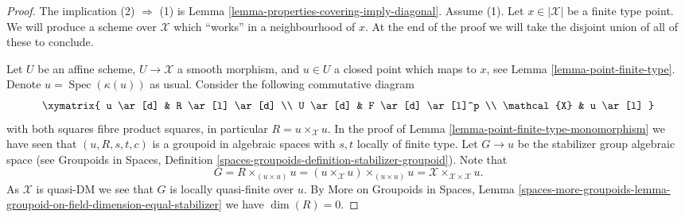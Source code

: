 \documentclass{stacks-project}
\theoremstyle{plain}
\theoremstyle{definition}
\theoremstyle{remark}
\numberwithin{equation}{subsection}
\def\Spec{\mathop{\mathrm{Spec}}}
\begin{document}
\begin{proof}
The implication (2) $\Rightarrow$ (1) is
Lemma \ref{lemma-properties-covering-imply-diagonal}.
Assume (1).
Let $x \in |\mathcal{X}|$ be a finite type point. We will produce a scheme
over $\mathcal{X}$ which ``works'' in a neighbourhood of $x$. At the end
of the proof we will take the disjoint union of all of these to conclude.

\medskip\noindent
Let $U$ be an affine scheme, $U \to \mathcal{X}$ a smooth morphism, and
$u \in U$ a closed point which maps to $x$, see
Lemma \ref{lemma-point-finite-type}.
Denote $u = \Spec(\kappa(u))$ as usual. Consider the following
commutative diagram
$$
\xymatrix{
u \ar[d] & R \ar[l] \ar[d] \\
U \ar[d] & F \ar[d] \ar[l]^p \\
\mathcal{X} & u \ar[l]
}
$$
with both squares fibre product squares, in particular
$R = u \times_\mathcal{X} u$. In the proof of
Lemma \ref{lemma-point-finite-type-monomorphism}
we have seen that $(u, R, s, t, c)$ is a groupoid in algebraic spaces
with $s, t$ locally of finite type. Let $G \to u$ be the stabilizer group
algebraic space (see
Groupoids in Spaces, Definition
\ref{spaces-groupoids-definition-stabilizer-groupoid}).
Note that
$$
G = R \times_{(u \times u)} u =
(u \times_\mathcal{X} u) \times_{(u \times u)} u =
\mathcal{X} \times_{\mathcal{X} \times \mathcal{X}} u.
$$
As $\mathcal{X}$ is quasi-DM we see that
$G$ is locally quasi-finite over $u$. By
More on Groupoids in Spaces, Lemma
\ref{spaces-more-groupoids-lemma-groupoid-on-field-dimension-equal-stabilizer}
we have $\dim(R) = 0$.


\end{proof}
\end{document}
